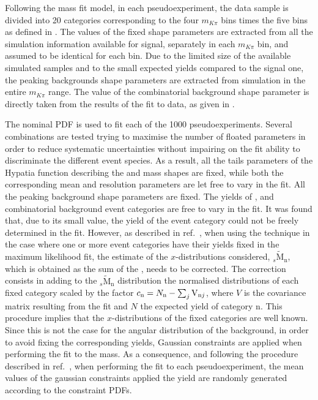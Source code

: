 Following the mass fit model, in each pseudoexperiment, the data sample is divided into 20 categories corresponding to the four $m_{K\pi}$ bins times the five \cosTmu bins as defined in . The values of the fixed shape parameters are extracted from all the simulation information available for signal, separately in each $m_{K\pi}$ bin, and assumed to be identical for each \cosTmu bin. Due to the limited size of the available simulated samples and to the small expected yields compared to the signal one, the peaking backgrounds shape parameters are extracted from simulation in the entire $m_{K\pi}$ range. The value of the combinatorial background shape parameter is directly taken from the results of the fit to data, as given in . 
%

The nominal PDF is used to fit each of the 1000 pseudoexperiments. Several combinations are tested trying to maximise the number of floated parameters in order to reduce systematic uncertainties without impairing on the fit ability to discriminate the different event species. 
As a result, all the tails parameters of the Hypatia function describing the \Bd and \Bs mass shapes are fixed, while both the corresponding mean and resolution parameters are let free to vary in the fit. All the peaking background shape parameters are fixed. The yields of \Bs, \Bd and combinatorial background event categories are free to vary in the fit. It was found that, due to its small value, the yield of the \LbJpsippi event category could not be freely determined in the fit. However, as described in ref.~\cite{Pivk:2004ty}, when using the \splot technique in the case where one or more event categories have their yields fixed in the maximum likelihood fit, the estimate of the $x$-distributions considered, $_s\tilde{\mathrm{M}}_\mathrm{n}$, which is obtained as the sum of the \sweights, needs to be corrected. The correction consists in adding to the $_s\tilde{\mathrm{M}}_\mathrm{n}$ distribution the normalised distributions of each fixed category scaled by the factor $c_{\rm n} = N_{\rm n} - \sum_j {\rm V}_{{\rm n}j}$, where $V$ is the covariance matrix resulting from the fit and $N$ the expected yield of category n. This procedure implies that the $x$-distributions of the fixed categories are well known. Since this is not the case for the angular distribution of the \LbJpsippi background, in order to avoid fixing the corresponding yields, Gaussian constraints are applied when performing the fit to the mass. As a consequence, and following the procedure described in ref.~\cite{Karbach:2012vg}, when performing the fit to each pseudoexperiment, the mean values of the gaussian constraints applied the \LbJpsippi yield are randomly generated according to the constraint PDFs. 
%

